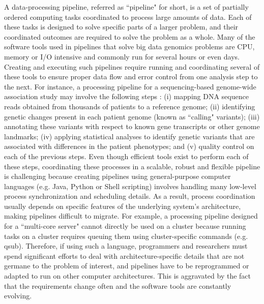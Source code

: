 A data-processing pipeline, referred as ``pipeline" for short, is a set of partially ordered computing tasks coordinated to process large amounts of data. Each of these tasks is designed to solve specific parts of a larger problem, and their coordinated outcomes are required to solve the problem as a whole. Many of the software tools used in pipelines that solve big data genomics problems are CPU, memory or I/O intensive and commonly run for several hours or even days. Creating and executing such pipelines require running and coordinating several of these tools to ensure proper data flow and error control from one analysis step to the next. For instance, a processing pipeline for a sequencing-based genome-wide association study may involve the following steps \cite{Auwera2013}: (i) mapping DNA sequence reads obtained from thousands of patients to a reference genome; (ii) identifying genetic changes present in each patient genome (known as ``calling" variants); (iii) annotating these variants with respect to known gene transcripts or other genome landmarks; (iv) applying statistical analyses to identify genetic variants that are associated with differences in the patient phenotypes; and (v) quality control on each of the previous steps. Even though efficient tools exist to perform each of these steps, coordinating these processes in a scalable, robust and flexible pipeline is challenging because creating pipelines using general-purpose computer languages (e.g. Java, Python or Shell scripting) involves handling many low-level process synchronization and scheduling details. As a result, process coordination usually depends on specific features of the underlying system’s architecture, making pipelines difficult to migrate. For example, a processing pipeline designed for a ``multi-core server" cannot directly be used on a cluster because running tasks on a cluster requires queuing them using cluster-specific commands (e.g. qsub). Therefore, if using such a language, programmers and researchers must spend significant efforts to deal with architecture-specific details that are not germane to the problem of interest, and pipelines have to be reprogrammed or adapted to run on other computer architectures. This is aggravated by the fact that the requirements change often and the software tools are constantly evolving.

